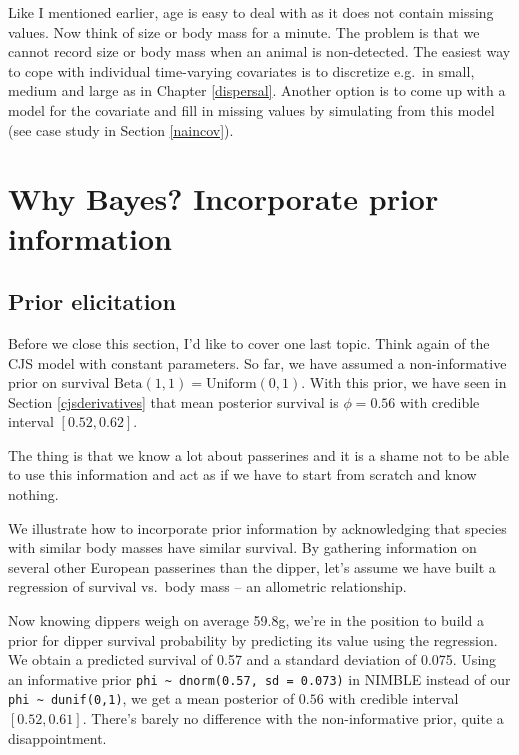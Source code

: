 \documentclass[
  12pt,
]{krantz}
\begin{document}
Like I mentioned earlier, age is easy to deal with as it does not contain missing values. Now think of size or body mass for a minute. The problem is that we cannot record size or body mass when an animal is non-detected. The easiest way to cope with individual time-varying covariates is to discretize e.g.~in small, medium and large as in Chapter \ref{dispersal}. Another option is to come up with a model for the covariate and fill in missing values by simulating from this model (see case study in Section \ref{naincov}).

\section{Why Bayes? Incorporate prior information}\label{elicitprior}

\subsection{Prior elicitation}\label{prior-elicitation}

Before we close this section, I'd like to cover one last topic. Think again of the CJS model with constant parameters. So far, we have assumed a non-informative prior on survival \(\text{Beta}(1,1) = \text{Uniform}(0,1)\). With this prior, we have seen in Section \ref{cjsderivatives} that mean posterior survival is \(\phi = 0.56\) with credible interval \([0.52,0.62]\).

The thing is that we know a lot about passerines and it is a shame not to be able to use this information and act as if we have to start from scratch and know nothing.

We illustrate how to incorporate prior information by acknowledging that species with similar body masses have similar survival. By gathering information on several other European passerines than the dipper, let's assume we have built a regression of survival vs.~body mass -- an allometric relationship.

Now knowing dippers weigh on average 59.8g, we're in the position to build a prior for dipper survival probability by predicting its value using the regression. We obtain a predicted survival of 0.57 and a standard deviation of 0.075. Using an informative prior \texttt{phi\ \textasciitilde{}\ dnorm(0.57,\ sd\ =\ 0.073)} in NIMBLE instead of our \texttt{phi\ \textasciitilde{}\ dunif(0,1)}, we get a mean posterior of \(0.56\) with credible interval \([0.52, 0.61]\). There's barely no difference with the non-informative prior, quite a disappointment.
\end{document}
